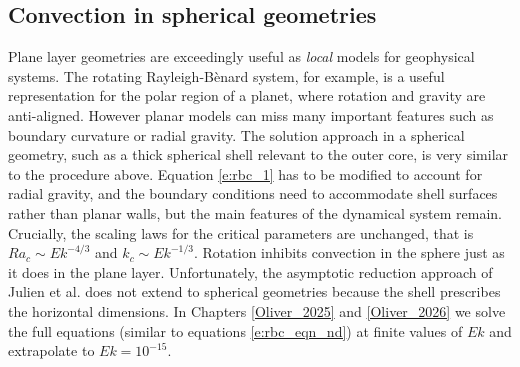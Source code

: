 
\subsection{Convection in spherical geometries}
Plane layer geometries are exceedingly useful as \textit{local} models for geophysical systems. 
The rotating Rayleigh-B\`enard system, for example, is a useful representation for the polar region of a planet, where rotation and gravity are anti-aligned. 
However planar models can miss many important features such as boundary curvature or radial gravity.
The solution approach in a spherical geometry, such as a thick spherical shell relevant to the outer core, is very similar to the procedure above. Equation \eqref{e:rbc_1} has to be modified to account for radial gravity, and the boundary conditions need to accommodate shell surfaces rather than planar walls, but the main features of the dynamical system remain. 
Crucially, the scaling laws for the critical parameters are unchanged, that is $Ra_{c}\sim Ek^{-4/3}$ and $k_{c}\sim Ek^{-1/3}$.
Rotation inhibits convection in the sphere just as it does in the plane layer. 
Unfortunately, the asymptotic reduction approach of Julien et al. does not extend to spherical geometries because the shell prescribes the horizontal dimensions. In Chapters \ref{Oliver_2025} and \ref{Oliver_2026} we solve the full equations (similar to equations \eqref{e:rbc_eqn_nd}) at finite values of $Ek$ and extrapolate to $Ek = 10^{-15}.$

